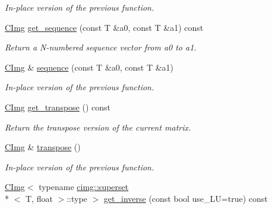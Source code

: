 \begin{DoxyCompactItemize}
\begin{DoxyCompactList}\small\item\em In-\/place version of the previous function. \end{DoxyCompactList}\item 
\hypertarget{structcimg__library_1_1_c_img_a02b819bc961c5de472d275f0cb91964f}{\hyperlink{structcimg__library_1_1_c_img}{C\-Img} \hyperlink{structcimg__library_1_1_c_img_a02b819bc961c5de472d275f0cb91964f}{get\-\_\-sequence} (const T \&a0, const T \&a1) const }\label{structcimg__library_1_1_c_img_a02b819bc961c5de472d275f0cb91964f}

\begin{DoxyCompactList}\small\item\em Return a N-\/numbered sequence vector from {\ttfamily a0} to {\ttfamily a1}. \end{DoxyCompactList}\item 
\hypertarget{structcimg__library_1_1_c_img_afa14119eeae2df407635589375793ff8}{\hyperlink{structcimg__library_1_1_c_img}{C\-Img} \& \hyperlink{structcimg__library_1_1_c_img_afa14119eeae2df407635589375793ff8}{sequence} (const T \&a0, const T \&a1)}\label{structcimg__library_1_1_c_img_afa14119eeae2df407635589375793ff8}

\begin{DoxyCompactList}\small\item\em In-\/place version of the previous function. \end{DoxyCompactList}\item 
\hypertarget{structcimg__library_1_1_c_img_ab8737309377bbea23ea4c44f3f2a2187}{\hyperlink{structcimg__library_1_1_c_img}{C\-Img} \hyperlink{structcimg__library_1_1_c_img_ab8737309377bbea23ea4c44f3f2a2187}{get\-\_\-transpose} () const }\label{structcimg__library_1_1_c_img_ab8737309377bbea23ea4c44f3f2a2187}

\begin{DoxyCompactList}\small\item\em Return the transpose version of the current matrix. \end{DoxyCompactList}\item 
\hypertarget{structcimg__library_1_1_c_img_aedfbb8bbd5a2699fe23834fcc4af42e1}{\hyperlink{structcimg__library_1_1_c_img}{C\-Img} \& \hyperlink{structcimg__library_1_1_c_img_aedfbb8bbd5a2699fe23834fcc4af42e1}{transpose} ()}\label{structcimg__library_1_1_c_img_aedfbb8bbd5a2699fe23834fcc4af42e1}

\begin{DoxyCompactList}\small\item\em In-\/place version of the previous function. \end{DoxyCompactList}\item 
\hypertarget{structcimg__library_1_1_c_img_ade4fea7290b696cab881fb8960fb41ef}{\hyperlink{structcimg__library_1_1_c_img}{C\-Img}$<$ typename \hyperlink{structcimg__library_1_1cimg_1_1superset}{cimg\-::superset}\\*
$<$ T, float $>$\-::type $>$ \hyperlink{structcimg__library_1_1_c_img_ade4fea7290b696cab881fb8960fb41ef}{get\-\_\-inverse} (const bool use\-\_\-\-L\-U=true) const }\label{structcimg__library_1_1_c_img_ade4fea7290b696cab881fb8960fb41ef}


\end{DoxyCompactItemize}
